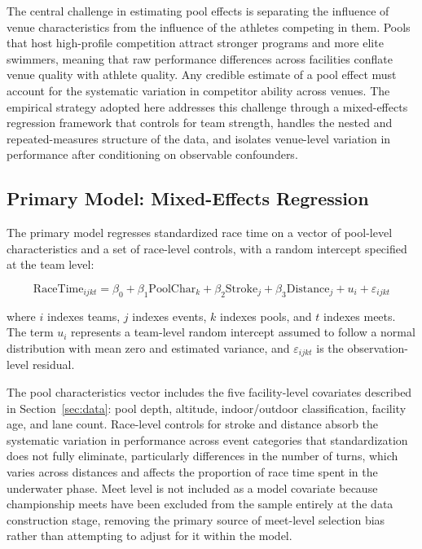 \documentclass[12pt]{article}
\begin{document}
The central challenge in estimating pool effects is separating the influence of
venue characteristics from the influence of the athletes competing in them.
Pools that host high-profile competition attract stronger programs and more
elite swimmers, meaning that raw performance differences across facilities
conflate venue quality with athlete quality. Any credible estimate of a pool
effect must account for the systematic variation in competitor ability across
venues. The empirical strategy adopted here addresses this challenge through a
mixed-effects regression framework that controls for team strength, handles the
nested and repeated-measures structure of the data, and isolates venue-level
variation in performance after conditioning on observable confounders.

\subsection{Primary Model: Mixed-Effects Regression}

The primary model regresses standardized race time on a vector of pool-level
characteristics and a set of race-level controls, with a random intercept
specified at the team level:

\begin{equation}
  \text{RaceTime}_{ijkt} = \beta_0 + \beta_1 \text{PoolChar}_k +
  \beta_2 \text{Stroke}_j + \beta_3 \text{Distance}_j +
  u_i + \varepsilon_{ijkt}
  \label{eq:primary}
\end{equation}

\noindent where $i$ indexes teams, $j$ indexes events, $k$ indexes pools, and
$t$ indexes meets. The term $u_i$ represents a team-level random intercept
assumed to follow a normal distribution with mean zero and estimated variance,
and $\varepsilon_{ijkt}$ is the observation-level residual.

The pool characteristics vector includes the five facility-level covariates
described in Section~\ref{sec:data}: pool depth, altitude, indoor/outdoor
classification, facility age, and lane count. Race-level controls for stroke
and distance absorb the systematic variation in performance across event
categories that standardization does not fully eliminate, particularly
differences in the number of turns, which varies across distances and affects
the proportion of race time spent in the underwater phase. Meet level is not
included as a model covariate because championship meets have been excluded
from the sample entirely at the data construction stage, removing the primary
source of meet-level selection bias rather than attempting to adjust for it
within the model.
\end{document}
